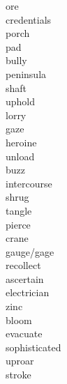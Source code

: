 \documentclass[b5paper, 11pt]{ctexart}
\begin{document}
\begin{multicols*}{3}
\begin{description}
\item[ore]

\item[credentials]

\item[porch]

\item[pad]

\item[bully]

\item[peninsula]

\item[shaft]

\item[uphold]

\item[lorry]

\item[gaze]

\item[heroine]

\item[unload]

\item[buzz]

\item[intercourse]

\item[shrug]

\item[tangle]

\item[pierce]

\item[crane]

\item[gauge/gage]

\item[recollect]

\item[ascertain]

\item[electrician]

\item[zinc]

\item[bloom]

\item[evacuate]

\item[sophisticated]

\item[uproar]

\item[stroke]


\end{description}
\end{multicols*}
\end{document}
